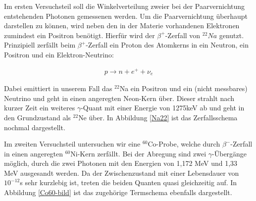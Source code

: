 \documentclass[11pt]{scrartcl}
\begin{document}
Im ersten Versuchsteil soll die Winkelverteilung zweier bei der Paarvernichtung entstehenden Photonen gemessenen werden. Um die Paarvernichtung überhaupt darstellen zu können, wird neben den in der Materie vorhandenen Elektronen zumindest ein Positron benötigt. Hierfür wird der $\beta^+$-Zerfall von $^{22}Na$ genutzt. Prinzipiell zerfällt beim $\beta^+$-Zerfall ein Proton des Atomkerns in ein Neutron, ein Positron und ein Elektron-Neutrino:

\begin{align}
p \rightarrow n + e^+ + \nu_e
\end{align}

Dabei emittiert in unserem Fall das $^{22}$Na  ein Positron und ein (nicht messbares) Neutrino und geht in einen angeregten Neon-Kern über. Dieser strahlt nach kurzer Zeit ein weiteres $\gamma$-Quant mit einer Energie von 1275keV ab und geht in den Grundzustand als $^{22}$Ne über. In Abbildung \ref{Na22} ist das Zerfallsschema nochmal dargestellt.

Im zweiten Versuchsteil untersuchen wir eine $^{60}$Co-Probe, welche durch $\beta^-$-Zerfall in einen angeregten $^{60}$Ni-Kern zerfällt. Bei der Abregung sind zwei $\gamma$-Übergänge möglich, durch die zwei Photonen mit den Energien von 1,172 MeV und 1,33 MeV ausgesandt werden. Da der Zwischenzustand mit einer Lebensdauer  von $10^{-12}$s sehr kurzlebig ist, treten die beiden Quanten quasi gleichzeitig auf. In Abbildung \ref{Co60-bild} ist das zugehörige Termschema ebenfalls dargestellt.
\end{document}
